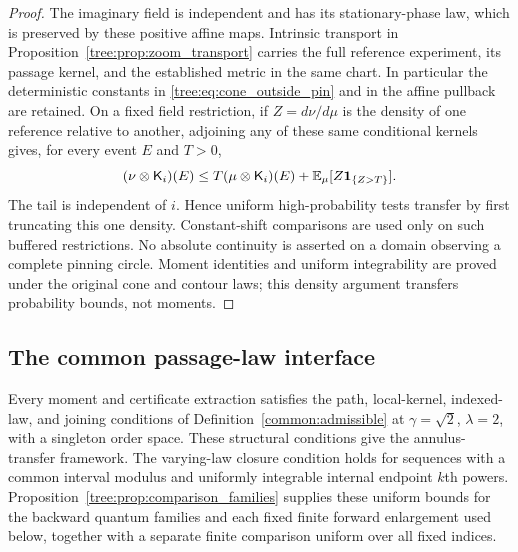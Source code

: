 \begin{proof}
The imaginary field is independent and has its stationary-phase law,
which is preserved by these positive affine maps. Intrinsic transport
in Proposition~\ref{tree:prop:zoom_transport} carries the full reference
experiment, its passage kernel, and the established metric in the same
chart. In particular the deterministic constants in
\eqref{tree:eq:cone_outside_pin} and in the affine pullback are retained.
On a fixed field restriction, if $Z=d\nu/d\mu$ is the density of one
reference relative to another, adjoining any of these same conditional
kernels gives, for every event $E$ and $T>0$,
\begin{equation}\label{tree:eq:reference_density_truncation}
 (\nu\otimes\mathsf K_i)(E)
 \le T(\mu\otimes\mathsf K_i)(E)
       +\mathbb E_\mu[Z\mathbf1_{\{Z>T\}}].
\end{equation}
The tail is independent of $i$. Hence uniform high-probability tests
transfer by first truncating this one density. Constant-shift
comparisons are used only on such buffered restrictions. No absolute
continuity is asserted on a domain observing a complete pinning circle.
Moment identities and uniform integrability are proved under the
original cone and contour laws; this density argument transfers
probability bounds, not moments.
\end{proof}

\subsection{The common passage-law interface}

\begin{lemma}
\label{tree:lem:common_interface}
Every moment and certificate extraction satisfies the path, local-kernel,
indexed-law, and joining conditions of Definition~\ref{common:admissible}
at $\gamma=\sqrt2$, $\lambda=2$, with a singleton order space.
These structural conditions give the annulus-transfer framework.
The varying-law closure condition holds for sequences with a common
interval modulus and uniformly integrable internal endpoint $k$th
powers. Proposition~\ref{tree:prop:comparison_families} supplies these
uniform bounds for the backward quantum families and each fixed finite
forward enlargement used below, together with a separate finite
comparison uniform over all fixed indices.
\end{lemma}

